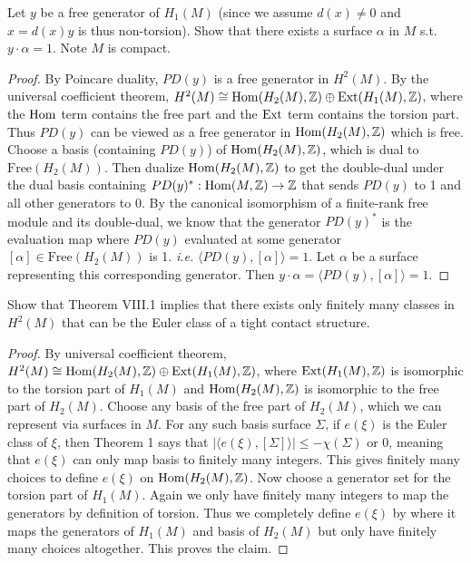 \documentclass[12pt]{article}
\begin{document}
\begin{problem}[3: IV Lemma 5]
Let $ y $ be a free generator of $ H_1(M)$ (since we assume $ d(x) \neq 0$ and $ x= d(x) y$ is thus non-torsion). Show that there exists a surface $ \alpha$ in $ M$  s.t.\ $ y \cdot \alpha = 1$. Note $ M$ is compact.

\begin{proof}
	By Poincare duality, $ PD(y)$ is a free generator in  $ H^2(M)$. By the universal coefficient theorem, $ H^2(M) \cong \operatorname{Hom}( H_2(M), \mathbb{Z}) \oplus \operatorname{Ext}(H_1(M),\mathbb{Z}) $, where the $ \operatorname{Hom}$ term contains the free part and the $ \operatorname{Ext}$ term contains the torsion part. Thus $ PD(y)$ can be viewed as a free generator in $\operatorname{Hom}(H_2(M), \mathbb{Z})$ which is free. Choose a basis (containing $ PD(y)$) of $ \operatorname{Hom}(H_2(M), \mathbb{Z})$, which is dual to $ \text{Free}(H_2(M))$. Then dualize $ \operatorname{Hom}(H_2(M), \mathbb{Z})$ to get the double-dual under the dual basis containing $ PD(y)^*: \operatorname{Hom}( M, \mathbb{Z}) \to \mathbb{Z}$ that sends $ PD(y)$ to 1 and all other generators to 0. By the canonical isomorphism of a finite-rank free module and its double-dual, we know that the generator $ PD(y)^* $ is the evaluation map where $ PD(y)$ evaluated at some generator $ [ \alpha] \in \text{Free}(H_2(M))$ is 1. \emph{i.e.} $ \langle PD(y), [ \alpha] \rangle =1$. Let $ \alpha$ be a surface representing this corresponding generator. Then $ y \cdot \alpha = \langle PD(y), [\alpha] \rangle = 1$.
\end{proof}
\end{problem}

\begin{problem}
Show that Theorem VIII.1 implies that there exists only finitely many classes in $ H^2(M)$ that can be the Euler class of a tight contact structure.
\begin{proof}
	By universal coefficient theorem, $ H^2(M) \cong \operatorname{Hom}( H_2(M), \mathbb{Z}) \oplus \operatorname{Ext}(H_1(M), \mathbb{Z})$, where $ \operatorname{Ext}(H_1(M), \mathbb{Z})$ is isomorphic to the torsion part of $ H_1(M)$ and $ \operatorname{Hom}( H_2(M), \mathbb{Z})$ is isomorphic to the free part of $ H_2(M)$. Choose any basis of the free part of  $ H_2(M)$, which we can represent via surfaces in $ M$. For any such basis surface $ \Sigma $, if $ e(\xi)$ is the Euler class of  $ \xi$, then Theorem 1 says that $ |\langle e(\xi), [ \Sigma ] \rangle| \leq -\chi( \Sigma )$ or $ 0$, meaning that $ e(\xi)$ can only map basis to finitely many integers. This gives finitely many choices to define $ e(\xi)$ on $ \operatorname{Hom}( H_2(M), \mathbb{Z})$. Now choose a generator set for the torsion part of $ H_1(M)$. Again we only have finitely many integers to map the generators by definition of torsion. Thus we completely define $ e(\xi)$ by where it maps the generators of $ H_1(M)$ and basis of $ H_2(M)$ but only have finitely many choices altogether. This proves the claim.
\end{proof}
\end{problem}
\end{document}
